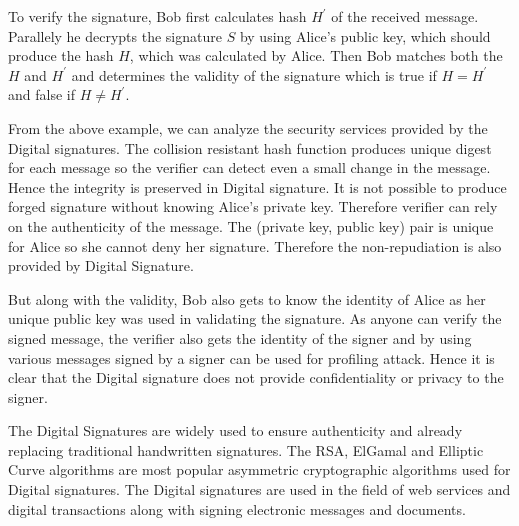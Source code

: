 To verify the signature, Bob first calculates hash $H^\prime$ of the received message. Parallely he decrypts the signature $S$ by using Alice's public key, which should produce the hash $H$, which was calculated by Alice. Then Bob matches both the $H$ and $H^\prime$ and determines the validity of the signature which is true if $H = H^\prime$ and false if $H \neq H^\prime$. 

From the above example, we can analyze the security services provided by the Digital signatures. The collision resistant hash function produces unique digest for each message so the verifier can detect even a small change in the message. Hence the integrity is preserved in Digital signature. It is not possible to produce forged signature without knowing Alice's private key. Therefore verifier can rely on the authenticity of the message. The (private key, public key) pair is unique for Alice so she cannot deny her signature. Therefore the non-repudiation is also provided by Digital Signature. 

But along with the validity, Bob also gets to know the identity of Alice as her unique public key was used in validating the signature. As anyone can verify the signed message, the verifier also gets the identity of the signer and by using various messages signed by a signer can be used for profiling attack. Hence it is clear that the Digital signature does not provide confidentiality or privacy to the signer.
 
The Digital Signatures are widely used to ensure authenticity and already replacing traditional handwritten signatures. The RSA, ElGamal and Elliptic Curve algorithms are most popular asymmetric cryptographic algorithms used for Digital signatures. The Digital signatures are used in the field of web services and digital transactions along with signing electronic messages and documents.

